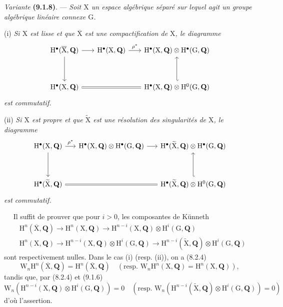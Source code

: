 \documentclass[11pt,leqno]{article}
\newcommand{\Page}[1]{\ifvmode\noindent\else\unskip\ \fi{\footnotesize\textcolor{gray}{[p.\,#1]}}\ \ignorespaces}
\begin{document}
\textit{Variante} \textbf{(9.1.8)}. — \textit{Soit \(\mathrm{X}\) un espace algébrique séparé sur lequel agit un groupe algébrique linéaire connexe \(\mathrm{G}\).}

(i) \textit{Si \(\mathrm{X}\) est lisse et que \(\overline{\mathrm{X}}\) est une compactification de \(\mathrm{X}\), le diagramme}
\[
\begin{tikzcd}[ampersand replacement=\&, column sep=1.8em, row sep=3.5em]
\mathrm{H}^{\bullet}(\overline{\mathrm{X}},\mathbf{Q})
  \arrow[r] \arrow[d]
\&
\mathrm{H}^{\bullet}(\mathrm{X},\mathbf{Q})
  \arrow[r, "\rho^{*}"]
\&
\mathrm{H}^{\bullet}(\mathrm{X},\mathbf{Q})\otimes
\mathrm{H}^{\bullet}(\mathrm{G},\mathbf{Q})
\\
\mathrm{H}^{\bullet}(\mathrm{X},\mathbf{Q})
  \arrow[rr, equal]
\& \&
\mathrm{H}^{\bullet}(\mathrm{X},\mathbf{Q})\otimes
\mathrm{H}^{0}(\mathrm{G},\mathbf{Q})
  \arrow[u, hook']
\end{tikzcd}
\]
\textit{est commutatif.}

(ii) \textit{Si \(\mathrm{X}\) est propre et que \(\widetilde{\mathrm{X}}\) est une résolution des singularités de \(\mathrm{X}\), le diagramme}
\[
\begin{tikzcd}[ampersand replacement=\&, column sep=1.5em, row sep=3.5em]
\mathrm{H}^{\bullet}(\mathrm{X},\mathbf{Q})
  \arrow[r, "\rho^{*}"] \arrow[d]
\&
\mathrm{H}^{\bullet}(\mathrm{X},\mathbf{Q})\otimes
\mathrm{H}^{\bullet}(\mathrm{G},\mathbf{Q})
  \arrow[r]
\&
\mathrm{H}^{\bullet}(\widetilde{\mathrm{X}},\mathbf{Q})\otimes
\mathrm{H}^{\bullet}(\mathrm{G},\mathbf{Q})
\\
\mathrm{H}^{\bullet}(\widetilde{\mathrm{X}},\mathbf{Q})
  \arrow[rr, equal]
\& \&
\mathrm{H}^{\bullet}(\widetilde{\mathrm{X}},\mathbf{Q})\otimes
\mathrm{H}^{0}(\mathrm{G},\mathbf{Q})
  \arrow[u, hook']
\end{tikzcd}
\]
\textit{est commutatif.}

\Page{48}
Il suffit de prouver que pour \(i>0\), les composantes de Künneth
\[
\begin{aligned}
&\mathrm{H}^{n}(\overline{\mathrm{X}},\mathbf{Q})
\to\mathrm{H}^{n}(\mathrm{X},\mathbf{Q})
\to\mathrm{H}^{n-i}(\mathrm{X},\mathbf{Q})\otimes\mathrm{H}^{i}(\mathrm{G},\mathbf{Q})
\\
&\mathrm{H}^{n}(\mathrm{X},\mathbf{Q})
\to\mathrm{H}^{n-i}(\mathrm{X},\mathbf{Q})\otimes\mathrm{H}^{i}(\mathrm{G},\mathbf{Q})
\to\mathrm{H}^{n-i}(\widetilde{\mathrm{X}},\mathbf{Q})\otimes\mathrm{H}^{i}(\mathrm{G},\mathbf{Q})
\end{aligned}
\]
sont respectivement nulles. Dans le cas (i) (resp. (ii)), on a (8.2.4)
\[
\mathrm{W}_{n}\mathrm{H}^{n}(\overline{\mathrm{X}},\mathbf{Q})
=\mathrm{H}^{n}(\overline{\mathrm{X}},\mathbf{Q})
\quad
(\text{resp. }\mathrm{W}_{n}\mathrm{H}^{n}(\mathrm{X},\mathbf{Q})
=\mathrm{H}^{n}(\mathrm{X},\mathbf{Q})),
\]
tandis que, par (8.2.4) et (9.1.6)
\[
\mathrm{W}_{n}(\mathrm{H}^{n-i}(\mathrm{X},\mathbf{Q})\otimes\mathrm{H}^{i}(\mathrm{G},\mathbf{Q}))=0
\quad
(\text{resp. }\mathrm{W}_{n}(\mathrm{H}^{n-i}(\widetilde{\mathrm{X}},\mathbf{Q})\otimes\mathrm{H}^{i}(\mathrm{G},\mathbf{Q}))=0)
\]
d’où l’assertion.
\end{document}
